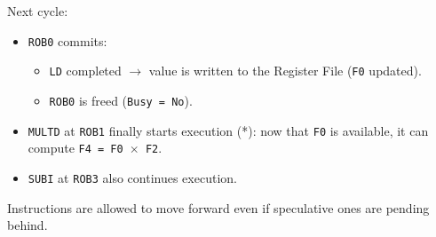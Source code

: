\begin{examplebox}
\begin{itemize}
\begin{center}
\begin{adjustbox}{width={.92\textwidth},totalheight={\textheight},keepaspectratio}
            \end{adjustbox}
        \end{center}
        Next cycle:
        \begin{itemize}
            \item \texttt{ROB0} commits:
            \begin{itemize}
                \item \texttt{LD} completed $\rightarrow$ value is written to the Register File (\texttt{F0} updated).
                \item \texttt{ROB0} is freed (\texttt{Busy = No}).
            \end{itemize}
            \item \texttt{MULTD} at \texttt{ROB1} finally starts execution (*): now that \texttt{F0} is available, it can compute \texttt{F4 = F0 $\times$ F2}.
            \item \texttt{SUBI} at \texttt{ROB3} also continues execution.
        \end{itemize}
        Instructions are allowed to move forward even if speculative ones are pending behind.



\end{itemize}
\end{examplebox}
